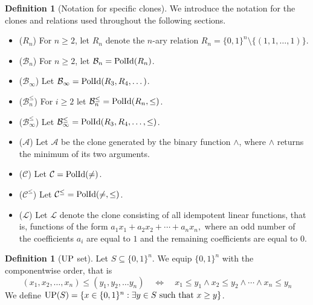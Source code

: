 \documentclass{amsart}
\numberwithin{equation}{section}
\theoremstyle{plain}
\theoremstyle{definition}
\newtheorem{definition}[theorem]{Definition}
\def\relation#1{#1}
\def\clone#1{\mathcal{#1}}
\def\Bc{\clone{B}}
\def\Ac{\clone{A}}
\def\Lc{\clone{L}}
\def\Cc{\clone{C}}
\def\PolId{{\rm PolId}}
\def\UP{{\rm UP}}
\begin{document}
\begin{definition}[Notation for specific clones]
We introduce the notation for the clones and relations used throughout the following sections.
\begin{itemize}
\item ($\relation{R}_n$) For $n\geq 2$, let $\relation{R}_n$ denote the $n$-ary relation $\relation{R}_n = \{0,1\}^n\setminus \{(1,1,\dots,1)\}.$
\item ($\Bc_n$) For $n\geq 2$, let $\Bc_n =\PolId(\relation{R}_n)$.
\item ($\Bc_{\infty}$) Let $\Bc_{\infty} = \PolId(\relation{R}_{3},\relation{R}_{4},\dots)$.
\item ($\Bc_n^{\leq}$) For $i\geq 2$ let $\Bc_n^{\leq} =\PolId(\relation{R}_n,\leq)$.
\item ($\Bc_{\infty}^{\leq}$) Let $\Bc_{\infty}^{\leq} = \PolId(\relation{R_3}, \relation{R}_4,\dots,\leq)$.
\item ($\Ac$) Let $\Ac$ be the clone generated by the binary function $\wedge$, where $\wedge$ returns the minimum of its two arguments.
\item ($\Cc$) Let $\Cc = \PolId(\neq)$.
\item ($\Cc^{\leq}$) Let  $\Cc^{\leq} = \PolId(\neq,\leq)$.
\item ($\Lc$) Let $\Lc$ denote the clone consisting of all idempotent linear functions, that is, functions of the form $a_1x_1+a_2x_2+\cdots+a_nx_n,$ where an odd number of the coefficients $a_i$ are equal to $1$ and the remaining coefficients are equal to $0$.
\end{itemize}
\end{definition}

\begin{definition}[$\UP$ set]
Let $S\subseteq \{0,1\}^n$. We equip $\{0,1\}^n$ with the componentwise order, that is
$$(x_1,x_2,\dots, x_n) \leq (y_1,y_2,\dots y_n) \quad \Leftrightarrow \quad x_1\leq y_1 \wedge x_2\leq y_2 \wedge \cdots\wedge x_n\leq y_n$$
We define $\UP(S)=\{x\in\{0,1\}^n : \exists y\in S \text{ such that } x\geq y\}$.
\end{definition}
\end{document}

